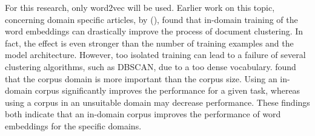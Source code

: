 \documentclass[../../Thesis.tex]{subfiles}
\begin{document}
For this research, only word2vec will be used.
Earlier work on this topic, concerning domain specific articles, by (\citet{Truong2017Thesis}), found that  
in-domain training of the word embeddings can drastically improve the process of document clustering. In fact, the effect is even stronger than the number of training examples and the model architecture. However, too isolated training can lead to a failure of several clustering algorithms, such as DBSCAN, due to a too dense vocabulary\cite{Truong2017Thesis}. 
\citet{lai2016generate} found that 
the corpus domain is more important than the corpus size. Using an in-domain corpus significantly improves the performance for a given task, whereas using a corpus in an unsuitable domain may decrease performance. 
These findings both indicate that an in-domain corpus improves the performance of word embeddings for the specific domains. 
\end{document}
